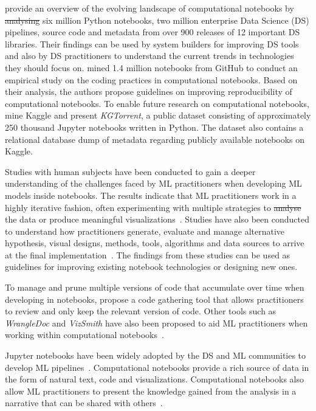 \documentclass[smallextended]{svjour3}       %
\providecommand{\DIFadd}[1]{{\protect\color{blue}\uwave{#1}}} %
\providecommand{\DIFdel}[1]{{\protect\color{red}\sout{#1}}} %
\providecommand{\DIFaddbegin}{} %
\providecommand{\DIFaddend}{} %
\providecommand{\DIFdelbegin}{} %
\providecommand{\DIFdelend}{} %
\newcommand{\DIFscaledelfig}{0.5}
\newlength{\DIFdelgraphicswidth} %
\newlength{\DIFdelgraphicsheight} %
\newcommand{\DIFaddincludegraphics}[2][]{{\color{blue}\fbox{\DIFOincludegraphics[#1]{#2}}}} %
\newcommand{\DIFdelincludegraphics}[2][]{%
\sbox{\DIFdelgraphicsbox}{\DIFOincludegraphics[#1]{#2}}%
\settoboxwidth{\DIFdelgraphicswidth}{\DIFdelgraphicsbox} %
\settoboxtotalheight{\DIFdelgraphicsheight}{\DIFdelgraphicsbox} %
\scalebox{\DIFscaledelfig}{%
\parbox[b]{\DIFdelgraphicswidth}{\usebox{\DIFdelgraphicsbox}\\[-\baselineskip] \rule{\DIFdelgraphicswidth}{0em}}\llap{\resizebox{\DIFdelgraphicswidth}{\DIFdelgraphicsheight}{%
\setlength{\unitlength}{\DIFdelgraphicswidth}%
\begin{picture}(1,1)%
\thicklines\linethickness{2pt} %
{\color[rgb]{1,0,0}\put(0,0){\framebox(1,1){}}}%
{\color[rgb]{1,0,0}\put(0,0){\line( 1,1){1}}}%
{\color[rgb]{1,0,0}\put(0,1){\line(1,-1){1}}}%
\end{picture}%
}\hspace*{3pt}}} %
} %
\DeclareRobustCommand{\DIFaddbegin}{\DIFOaddbegin \let\includegraphics\DIFaddincludegraphics} %
\DeclareRobustCommand{\DIFaddend}{\DIFOaddend \let\includegraphics\DIFOincludegraphics} %
\DeclareRobustCommand{\DIFdelbegin}{\DIFOdelbegin \let\includegraphics\DIFdelincludegraphics} %
\DeclareRobustCommand{\DIFdelend}{\DIFOaddend \let\includegraphics\DIFOincludegraphics} %
\begin{document}
\citet{psallidas2019data} provide an overview of the evolving landscape of computational notebooks by \DIFdelbegin \DIFdel{analysing }\DIFdelend \DIFaddbegin \DIFadd{analyzing }\DIFaddend six million Python notebooks, two million enterprise Data Science (DS) pipelines, source code and metadata from over 900 releases of 12 important DS libraries. Their findings can be used by system builders for improving DS tools and also by DS practitioners to understand the current trends in technologies they should focus on. \citet{pimentel2019large-scale} mined 1.4 million notebooks from GitHub to conduct an empirical study on the coding practices in computational notebooks. Based on their analysis, the authors propose guidelines on improving reproducibility of computational notebooks. To enable future research on computational notebooks, \citet{quaranta2021kgtorrent} mine Kaggle and present \textit{KGTorrent}, a public dataset consisting of approximately 250 thousand Jupyter notebooks written in Python. The dataset also contains a relational database dump of metadata regarding publicly available notebooks on Kaggle.

Studies with human subjects have been conducted to gain a deeper understanding of the challenges faced by ML practitioners when developing ML models inside notebooks. The results indicate that ML practitioners work in a highly iterative fashion, often experimenting with multiple strategies to \DIFdelbegin \DIFdel{analyse }\DIFdelend \DIFaddbegin \DIFadd{analyze }\DIFaddend the data or produce meaningful visualizations~\citep{kandel2012enterprise,kery2018story,liu2019understanding,chattopadhyay2020whats}. Studies have also been conducted to understand how practitioners generate, evaluate and manage alternative hypothesis, visual designs, methods, tools, algorithms and data sources to arrive at the final implementation~\citep{liu2019understanding,kandel2012enterprise}. The findings from these studies can be used as guidelines for improving existing notebook technologies or designing new ones.

To manage and prune multiple versions of code that accumulate over time when developing in notebooks, \citet{head2019managing} propose a code gathering tool that allows practitioners to review and only keep the relevant version of code. Other tools such as \textit{WrangleDoc} and \textit{VizSmith} have also been proposed to aid ML practitioners when working within computational notebooks~\citep{yang2021subtle,bavishi2021vizsmith}.

Jupyter notebooks have been widely adopted by the DS and ML communities to develop ML pipelines~\citep{wang2020assessing,pimentel2019large-scale,quaranta2021kgtorrent}. Computational notebooks provide a rich source of data in the form of natural text, code and visualizations. Computational notebooks also allow ML practitioners to present the knowledge gained from the analysis in a narrative that can be shared with others~\citep{rule2018exploration}.
\end{document}
